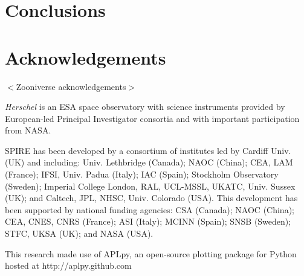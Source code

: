 \documentclass[a4,useAMS,usenatbib]{mn2e}
\newcommand*{\chck}[1]{{\color{red}$<$#1$>$}}
\begin{document}
\section{Conclusions}


\section{Acknowledgements}
\chck{Zooniverse acknowledgements}

{\em Herschel} is an ESA space observatory with science instruments
provided by European-led Principal Investigator consortia and with important
participation from NASA.

SPIRE has been developed by a consortium of institutes led by Cardiff
Univ. (UK) and including: Univ. Lethbridge (Canada); NAOC (China);
CEA, LAM (France); IFSI, Univ. Padua (Italy); IAC (Spain); Stockholm
Observatory (Sweden); Imperial College London, RAL, UCL-MSSL, UKATC,
Univ. Sussex (UK); and Caltech, JPL, NHSC, Univ. Colorado (USA). This
development has been supported by national funding agencies: CSA
(Canada); NAOC (China); CEA, CNES, CNRS (France); ASI (Italy); MCINN
(Spain); SNSB (Sweden); STFC, UKSA (UK); and NASA (USA).

This research made use of APLpy, an open-source plotting package for
Python hosted at http://aplpy.github.com
\end{document}
